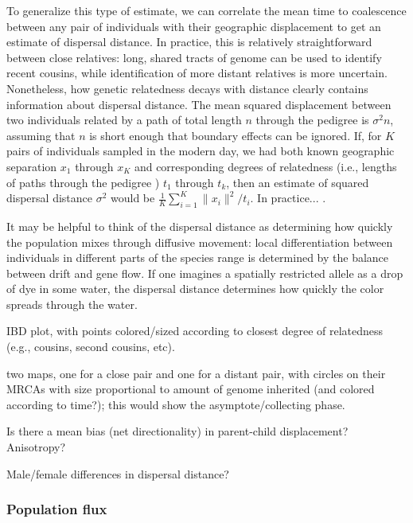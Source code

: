 \documentclass{ar-1col}
\begin{document}
To generalize this type of estimate,
we can correlate the mean time to coalescence between any pair of individuals
with their geographic displacement
to get an estimate of dispersal distance.
In practice,
this is relatively straightforward between close relatives:
long, shared tracts of genome can be used to identify recent cousins,
while identification of more distant relatives is more uncertain.
Nonetheless, how genetic relatedness decays with distance
clearly contains information about dispersal distance.
The mean squared displacement between two individuals
related by a path of total length $n$ through the pedigree
is $\sigma^2 n$,
assuming that $n$ is short enough that boundary effects can be ignored.
If, for $K$ pairs of individuals sampled in the modern day,
we had both known geographic separation $x_1$ through $x_K$
and corresponding degrees of relatedness (i.e., lengths of paths through the pedigree )
$t_1$ through $t_k$,
then an estimate of squared dispersal distance $\sigma^2$ would be
$\frac{1}{K}\sum_{i=1}^K \|x_i\|^2 / t_i$.
In practice... \cite{Malecot, Barton, Harald}.


It may be helpful to think of the dispersal distance
as determining how quickly the population mixes through diffusive movement:
local differentiation between individuals in different parts of the species range
is determined by the balance between drift and gene flow.
If one imagines a spatially restricted allele
as a drop of dye in some water,
the dispersal distance determines how quickly the
color spreads through the water. 

 IBD plot, with points colored/sized according to closest degree of relatedness
(e.g., cousins, second cousins, etc).

 two maps, one for a close pair and one for a distant pair, with circles on their MRCAs
with size proportional to amount of genome inherited (and colored according to time?);
this would show the asymptote/collecting phase.

Is there a mean bias (net directionality) in parent-child displacement? Anisotropy?

Male/female differences in dispersal distance?

\subsubsection{Population flux}
\end{document}
